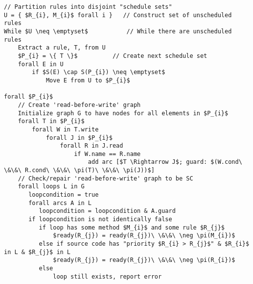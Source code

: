 \begin{lstlisting}[mathescape=true]
// Partition rules into disjoint "schedule sets"
U = { $R_{i}, M_{i}$ forall i }   // Construct set of unscheduled rules
While $U \neq \emptyset$           // While there are unscheduled rules
    Extract a rule, T, from U
    $P_{i} = \{ T \}$          // Create next schedule set
    forall E in U
        if $S(E) \cap S(P_{i}) \neq \emptyset$
            Move E from U to $P_{i}$

forall $P_{i}$
    // Create 'read-before-write' graph
    Initialize graph G to have nodes for all elements in $P_{i}$
    forall T in $P_{i}$
        forall W in T.write
            forall J in $P_{i}$
                forall R in J.read
                    if W.name == R.name
                        add arc [$T \Rightarrow J$; guard: $(W.cond\ \&\&\ R.cond\ \&\&\ \pi(T)\ \&\&\ \pi(J))$]
    // Check/repair 'read-before-write' graph to be SC
    forall loops L in G
       loopcondition = true
       forall arcs A in L 
          loopcondition = loopcondition & A.guard
       if loopcondition is not identically false
          if loop has some method $M_{i}$ and some rule $R_{j}$
              $ready(R_{j}) = ready(R_{j})\ \&\&\ \neg \pi(M_{i})$
          else if source code has "priority $R_{i} > R_{j}$" & $R_{i}$ in L & $R_{j}$ in L
              $ready(R_{j}) = ready(R_{j})\ \&\&\ \neg \pi(R_{i})$
          else
              loop still exists, report error
\end{lstlisting}

